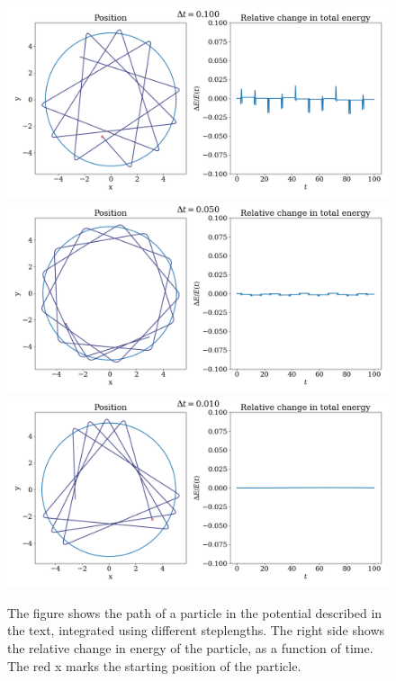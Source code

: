 \documentclass{article}
\begin{document}
        
        \begin{figure}            
            \vspace{-30pt}
            \includegraphics[width = \textwidth]{one_particle_01}
            \includegraphics[width = \textwidth]{one_particle_005}
            \includegraphics[width = \textwidth]{one_particle_001}
            \caption{The figure shows the path of a particle in the potential described in the text, integrated using different steplengths. The right side shows the relative change in energy of the particle, as a function of time. The red x marks the starting position of the particle.}
            \label{task 1}
        \end{figure}
\end{document}
